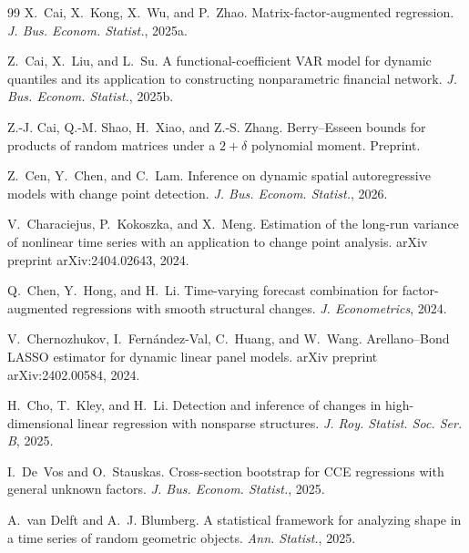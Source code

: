 \documentclass[12pt]{article}
\begin{document}
{\begin{thebibliography}{99}
X.~Cai, X.~Kong, X.~Wu, and P.~Zhao.
\newblock Matrix-factor-augmented regression.
\newblock \emph{J. Bus. Econom. Statist.}, 2025a.

Z.~Cai, X.~Liu, and L.~Su.
\newblock A functional-coefficient {VAR} model for dynamic quantiles and its application to constructing nonparametric financial network.
\newblock \emph{J. Bus. Econom. Statist.}, 2025b.

Z.-J. Cai, Q.-M. Shao, H.~Xiao, and Z.-S. Zhang.
\newblock Berry--{E}sseen bounds for products of random matrices under a $2+\delta$ polynomial moment.
\newblock Preprint.

Z.~Cen, Y.~Chen, and C.~Lam.
\newblock Inference on dynamic spatial autoregressive models with change point detection.
\newblock \emph{J. Bus. Econom. Statist.}, 2026.

V.~Characiejus, P.~Kokoszka, and X.~Meng.
\newblock Estimation of the long-run variance of nonlinear time series with an application to change point analysis.
\newblock arXiv preprint arXiv:2404.02643, 2024.

Q.~Chen, Y.~Hong, and H.~Li.
\newblock Time-varying forecast combination for factor-augmented regressions with smooth structural changes.
\newblock \emph{J. Econometrics}, 2024.

V.~Chernozhukov, I.~Fern{\'a}ndez-Val, C.~Huang, and W.~Wang.
\newblock Arellano--{B}ond {LASSO} estimator for dynamic linear panel models.
\newblock arXiv preprint arXiv:2402.00584, 2024.

H.~Cho, T.~Kley, and H.~Li.
\newblock Detection and inference of changes in high-dimensional linear regression with nonsparse structures.
\newblock \emph{J. Roy. Statist. Soc. Ser. B}, 2025.

I.~De~Vos and O.~Stauskas.
\newblock Cross-section bootstrap for {CCE} regressions with general unknown factors.
\newblock \emph{J. Bus. Econom. Statist.}, 2025.

A.~van Delft and A.~J. Blumberg.
\newblock A statistical framework for analyzing shape in a time series of random geometric objects.
\newblock \emph{Ann. Statist.}, 2025.


\end{thebibliography}}
\end{document}
